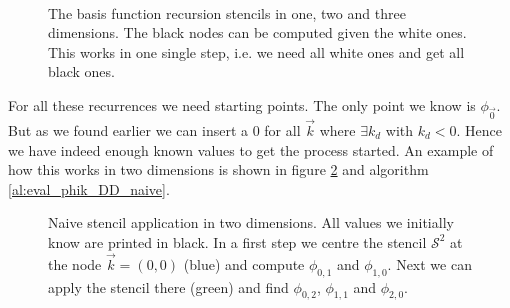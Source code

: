 \begin{figure}[h!]
  \centering
  \subfloat[][$\mathcal{S}^1$]{
    
  }
  \subfloat[][$\mathcal{S}^2$]{
    
  }
  \subfloat[][$\mathcal{S}^3$]{
    
  } \\
    \caption[Full recursion stencils in one, two and three dimensions]{The basis
    function recursion stencils in one, two and three dimensions. The black nodes
    can be computed given the white ones. This works in one single step, i.e.
    we need all white ones and get all black ones.}
    \label{fig:recursion_stencils_full}
\end{figure}

For all these recurrences we need starting points. The only point we know is $\phi_{\vec{0}}$.
But as we found earlier we can insert a $0$ for all $\vec{k}$ where $\exists k_d$ with $k_d < 0$.
Hence we have indeed enough known values to get the process started. An example
of how this works in two dimensions is shown in figure \ref{fig:naive_stencil_application}
and algorithm \ref{al:eval_phik_DD_naive}.

\begin{figure}
  \centering
  
  \caption[Naive stencil application in two dimensions]{Naive stencil application
           in two dimensions. All values we initially know are printed in black.
           In a first step we centre the stencil $\mathcal{S}^2$ at the node
           $\vec{k} = (0,0)$ (blue) and compute $\phi_{0,1}$ and $\phi_{1,0}$.
           Next we can apply the stencil there (green) and find $\phi_{0,2}$,
           $\phi_{1,1}$ and $\phi_{2,0}$.}
  \label{fig:naive_stencil_application}
\end{figure}

